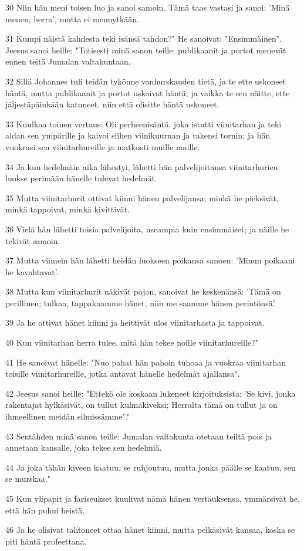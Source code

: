 \par 30 Niin hän meni toisen luo ja sanoi samoin. Tämä taas vastasi ja sanoi: 'Minä menen, herra', mutta ei mennytkään.
\par 31 Kumpi näistä kahdesta teki isänsä tahdon?" He sanoivat: "Ensimmäinen". Jeesus sanoi heille: "Totisesti minä sanon teille: publikaanit ja portot menevät ennen teitä Jumalan valtakuntaan.
\par 32 Sillä Johannes tuli teidän tykönne vanhurskauden tietä, ja te ette uskoneet häntä, mutta publikaanit ja portot uskoivat häntä; ja vaikka te sen näitte, ette jäljestäpäinkään katuneet, niin että olisitte häntä uskoneet.
\par 33 Kuulkaa toinen vertaus: Oli perheenisäntä, joka istutti viinitarhan ja teki aidan sen ympärille ja kaivoi siihen viinikuurnan ja rakensi tornin; ja hän vuokrasi sen viinitarhureille ja matkusti muille maille.
\par 34 Ja kun hedelmäin aika lähestyi, lähetti hän palvelijoitansa viinitarhurien luokse perimään hänelle tulevat hedelmät.
\par 35 Mutta viinitarhurit ottivat kiinni hänen palvelijansa; minkä he pieksivät, minkä tappoivat, minkä kivittivät.
\par 36 Vielä hän lähetti toisia palvelijoita, useampia kuin ensimmäiset; ja näille he tekivät samoin.
\par 37 Mutta viimein hän lähetti heidän luokseen poikansa sanoen: 'Minun poikaani he kavahtavat'.
\par 38 Mutta kun viinitarhurit näkivät pojan, sanoivat he keskenänsä: 'Tämä on perillinen; tulkaa, tappakaamme hänet, niin me saamme hänen perintönsä'.
\par 39 Ja he ottivat hänet kiinni ja heittivät ulos viinitarhasta ja tappoivat.
\par 40 Kun viinitarhan herra tulee, mitä hän tekee noille viinitarhureille?"
\par 41 He sanoivat hänelle: "Nuo pahat hän pahoin tuhoaa ja vuokraa viinitarhan toisille viinitarhureille, jotka antavat hänelle hedelmät ajallansa".
\par 42 Jeesus sanoi heille: "Ettekö ole koskaan lukeneet kirjoituksista: 'Se kivi, jonka rakentajat hylkäsivät, on tullut kulmakiveksi; Herralta tämä on tullut ja on ihmeellinen meidän silmissämme'?
\par 43 Sentähden minä sanon teille: Jumalan valtakunta otetaan teiltä pois ja annetaan kansalle, joka tekee sen hedelmiä.
\par 44 Ja joka tähän kiveen kaatuu, se ruhjoutuu, mutta jonka päälle se kaatuu, sen se murskaa."
\par 45 Kun ylipapit ja fariseukset kuulivat nämä hänen vertauksensa, ymmärsivät he, että hän puhui heistä.
\par 46 Ja he olisivat tahtoneet ottaa hänet kiinni, mutta pelkäsivät kansaa, koska se piti häntä profeettana.

